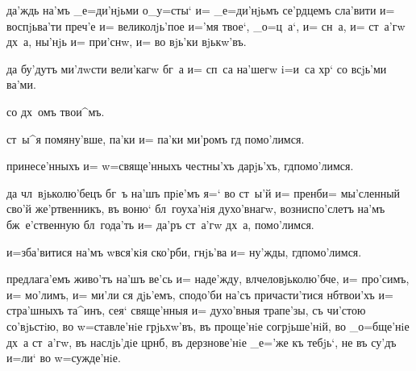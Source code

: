 

 да'ждь на'мъ _е=ди'нjьми о_у=сты` и= _е=ди'нjьмъ 
се'рдцемъ сла'вити и= воспjьва'ти преч'е и= 
великолjь'пое и='мя твое`, _о=ц~а`, и= сн~а, и= ст~а'гw 
дх~а, ны'нjь и= при'снw, и= во вjь'ки вjькw'въ.



 да бу'дутъ ми'лwсти вели'кагw бг~а и= сп~са на'шегw 
i=и~са хр` со всjь'ми ва'ми.

 со дх~омъ твои^мъ.


 ст~ы^я помяну'вше, па'ки и= па'ки ми'ромъ гд 
помо'лимся.


 принесе'нныхъ и= w=свяще'нныхъ честны'хъ дарjь'хъ, 
гд помо'лимся.


 да чл~вjьколю'бецъ бг~ъ на'шъ прiе'мъ я=` во 
ст~ы'й и= пренб и= мы'сленный сво'й же'ртвенникъ, въ 
воню` бл~гоуха'нiя духо'внагw, возниспо'слетъ на'мъ 
бж~е'ственную бл~года'ть и= да'ръ ст~а'гw дх~а, 
помо'лимся.


 и=зба'витися на'мъ w\т вся'кiя ско'рби, гнjь'ва и= 
ну'жды, гд помо'лимся.



 предлага'емъ живо'тъ на'шъ ве'сь и= наде'жду, 
вл человjьколю'бче, и= про'симъ, и= мо'лимъ, и= ми'ли 
ся дjь'емъ, сподо'би на'съ причасти'тися нб твои'хъ 
и= стра'шныхъ та^инъ, сея` свяще'нныя и= духо'вныя 
трапе'зы, съ чи'стою со'вjьстiю, во w=ставле'нiе 
грjьхw'въ, въ проще'нiе согрjьше'нiй, во _о=бще'нiе дх~а 
ст~а'гw, въ наслjь'дiе цр нб, въ дерзнове'нiе 
_е='же къ тебjь`, не въ су'дъ и=ли` во w=сужде'нiе.


